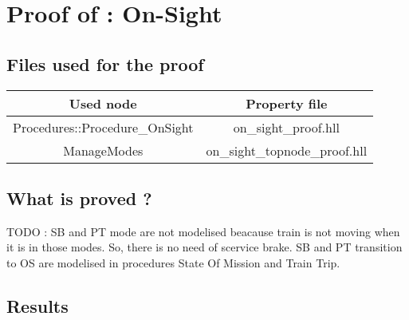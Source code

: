 \section{Proof of : On-Sight}
\subsection{Files used for the proof}
\begin{tabular}{|c|c|}
\hline
Used node & Property file \\ \hline
Procedures::Procedure\_OnSight & on\_sight\_proof.hll \\
\hline
ManageModes & on\_sight\_topnode\_proof.hll \\
\hline
\end{tabular}

\subsection{What is proved ?}

TODO : SB and PT mode are not modelised beacause train is not moving
when it is in those modes. So, there is no need of scervice brake. SB
and PT transition to OS are modelised in procedures State Of Mission
and Train Trip.








\subsection{Results}
